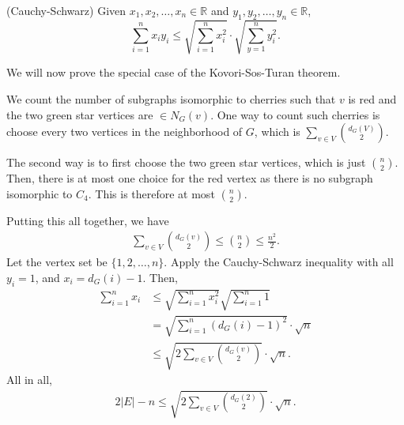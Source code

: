 
\begin{theorem}
	(Cauchy-Schwarz) Given \( x_{1}, x_{2}, \ldots  ,x_n \in \mathbb{R}  \) and \( y_{1}, y_{2}, \ldots , y_n \in \mathbb{R} \), \[
		\sum_{i=1}^{n}x_iy_i \le \sqrt{\sum_{i=1}^{n} x_{i}^{2} } \cdot \sqrt{\sum_{y=1}^{n} y_{i}^{2} } 
	.\] 
\end{theorem}

We will now prove the special case of the Kovori-Sos-Turan theorem.

\begin{replacementproof}
	We count the number of subgraphs isomorphic to cherries such that \( v \) is red and the two green star vertices are \( \in N_G(v) \). One way to count such cherries is choose every two vertices in the neighborhood of \( G \), which is \( \sum_{v \in V} \binom{d_G(V)}{2} \).

	The second way is to first choose the two green star vertices, which is just \( \binom{n}{2} \). Then, there is at most one choice for the red vertex as there is no subgraph isomorphic to \( C_4 \). This is therefore at most \( \binom{n}{2} \).

	Putting this all together, we have 
	\begin{align*}
		\sum_{v \in V}\binom{d_G(v)}{2} \le \binom{n}{2} \le \frac{n^{2}}{2}
	.\end{align*}
	Let the vertex set be \( \{1, 2, \ldots , n\}   \). Apply the Cauchy-Schwarz inequality with all \( y_{i}=1 \), and \( x_i = d_G(i) - 1 \). Then, 
	\begin{align*}
		\sum_{i=1}^{n} x_i &\le  \sqrt{\sum_{i=1}^{n} x_i^{2} } \sqrt{\sum_{i=1}^{n} 1} \\
		&= \sqrt{\sum_{i=1}^{n} (d_G(i) - 1)^{2} } \cdot \sqrt{n}   \\
		&\le \sqrt{ 2 \sum_{v  \in V} \binom{d_G(v)}{2}} \cdot \sqrt{n}
	.\end{align*}
	All in all, 
	\begin{align*}
		2|E|-n \le \sqrt{2 \sum_{v \in V}\binom{d_G(2)}{2}} \cdot \sqrt{n} 
	.\end{align*}
\end{replacementproof}
